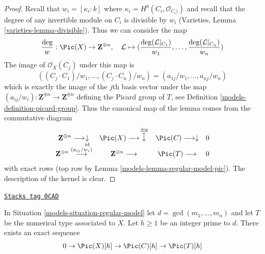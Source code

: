 \begin{proof}

Recall that $w_i = [\kappa_i : k]$ where
$\kappa_i = H^0(C_i, \mathcal{O}_{C_i)})$ and recall
that the degree of any invertible module on $C_i$ is divisible
by $w_i$ (Varieties, Lemma \ref{varieties-lemma-divisible}).
Thus we can consider the map
$$
\frac{\deg}{w} : \Pic(X) \to \mathbf{Z}^{\oplus n}, \quad
\mathcal{L} \mapsto
(\frac{\deg(\mathcal{L}|_{C_1})}{w_1}, \ldots,
\frac{\deg(\mathcal{L}|_{C_n})}{w_n})
$$
The image of $\mathcal{O}_X(C_j)$ under this map is
$$
((C_j \cdot C_1)/w_1, \ldots, (C_j \cdot C_n)/w_n) =
(a_{1j}/w_1, \ldots, a_{nj}/w_n)
$$
which is exactly the image of the $j$th basis vector under the map
$(a_{ij}/w_i) : \mathbf{Z}^{\oplus n} \to \mathbf{Z}^{\oplus n}$
defining the Picard group of $T$, see
Definition \ref{models-definition-picard-group}.
Thus the canonical map of the lemma comes from the commutative
diagram
$$
\begin{array}{cccc}\mathbf{Z}^{\oplus n} \longrightarrow\underset{\text{id}}{\downarrow} & \Pic(X) \longrightarrow\overset{\frac{\deg}{w}}{\downarrow} & \Pic(C) \longrightarrow\downarrow & 0 \\ \mathbf{Z}^{\oplus n} \overset{(a_{ij}/w_i)}{\longrightarrow} & \mathbf{Z}^{\oplus n} \longrightarrow & \Pic(T) \longrightarrow & 0\end{array}
$$
with exact rows (top row by Lemma \ref{models-lemma-regular-model-pic}).
The description of the kernel is clear.
\end{proof}

\begin{lemma}
\label{models-lemma-sequence-torsion}
\href{https://stacks.math.columbia.edu/tag/0CAD}{\texttt{Stacks tag 0CAD}}

In Situation \ref{models-situation-regular-model} let $d = \gcd(m_1, \ldots, m_n)$
and let $T$ be the numerical type associated to $X$.
Let $h \geq 1$ be an integer prime to $d$. There exists an exact sequence
$$
0 \to \Pic(X)[h] \to \Pic(C)[h] \to \Pic(T)[h]
$$
\end{lemma}

